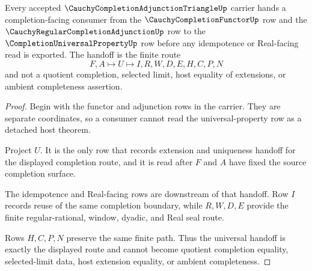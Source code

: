\begin{theorem}
\label{thm:cauchy-completion-adjunction-triangle-universal-handoff}
Every accepted $\CauchyCompletionAdjunctionTriangleUp$ carrier hands a completion-facing consumer from the $\CauchyCompletionFunctorUp$ row and the $\CauchyRegularCompletionAdjunctionUp$ row to the $\CompletionUniversalPropertyUp$ row before any idempotence or Real-facing read is exported. The handoff is the finite route
$$
F,A \longmapsto U \longmapsto I,R,W,D,E,H,C,P,N
$$
and not a quotient completion, selected limit, host equality of extensions, or ambient completeness assertion.
\end{theorem}
\begin{proof}
Begin with the functor and adjunction rows in the carrier. They are separate coordinates, so a consumer cannot read the universal-property row as a detached host theorem.

Project $U$. It is the only row that records extension and uniqueness handoff for the displayed completion route, and it is read after $F$ and $A$ have fixed the source completion surface.

The idempotence and Real-facing rows are downstream of that handoff. Row $I$ records reuse of the same completion boundary, while $R,W,D,E$ provide the finite regular-rational, window, dyadic, and Real seal route.

Rows $H,C,P,N$ preserve the same finite path. Thus the universal handoff is exactly the displayed route and cannot become quotient completion equality, selected-limit data, host extension equality, or ambient completeness.
\end{proof}

